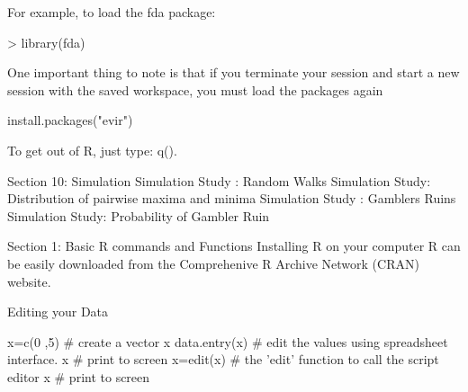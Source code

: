 
\begin{frame}

For example, to load the fda package:

> library(fda)

One important thing to note is that if you terminate your session and start a new session with the saved workspace, you must load  the packages again



install.packages("evir")
 
To get out of R, just type: q(). 

\end{frame}

\begin{frame}

Section 10: Simulation
Simulation Study : Random Walks
Simulation Study: Distribution of pairwise maxima and minima
Simulation Study : Gamblers Ruins
Simulation Study: Probability of Gambler Ruin

\end{frame}
\begin{frame}

Section 1: Basic R commands and Functions
Installing R on your computer
R can be easily downloaded from the Comprehenive R Archive Network (CRAN) website.
\end{frame}
\begin{frame}

Editing your Data

x=c(0 ,5)     	      # create a vector x
data.entry(x)  	   # edit the values using spreadsheet interface.
x  	                     # print to screen
x=edit(x)	          # the 'edit' function to call the script editor
x  	                     # print to screen

\end{frame}

